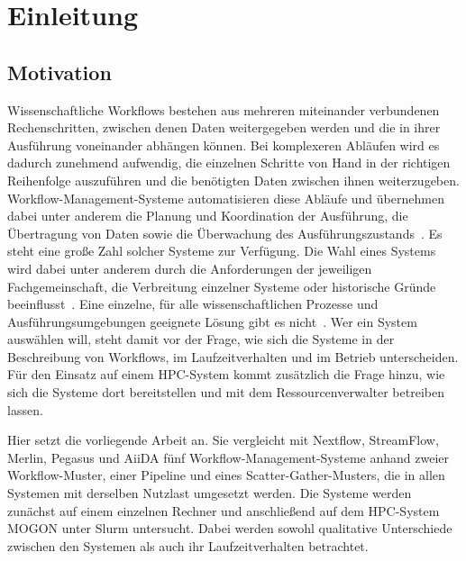 \chapter{Einleitung}
\label{sec:intro}

\section{Motivation}
\label{sec:intro:motivation}
Wissenschaftliche Workflows bestehen aus mehreren miteinander
verbundenen Rechenschritten, zwischen denen Daten weitergegeben
werden und die in ihrer Ausführung voneinander abhängen können.
Bei komplexeren Abläufen wird es dadurch zunehmend aufwendig, die
einzelnen Schritte von Hand in der richtigen Reihenfolge
auszuführen und die benötigten Daten zwischen ihnen weiterzugeben.
Workflow-Management-Systeme automatisieren diese Abläufe und
übernehmen dabei unter anderem die Planung und Koordination der
Ausführung, die Übertragung von Daten sowie die Überwachung des
Ausführungszustands~\cite[S.~28\,f.]{badia2017workflows}\cite[S.~2]{suter2026terminology}.
Es steht eine große Zahl solcher Systeme zur Verfügung. Die Wahl
eines Systems wird dabei unter anderem durch die Anforderungen der
jeweiligen Fachgemeinschaft, die Verbreitung einzelner Systeme
oder historische Gründe beeinflusst~\cite[S.~28]{badia2017workflows}. Eine einzelne, für alle wissenschaftlichen Prozesse und Ausführungsumgebungen geeignete Lösung gibt es nicht~\cite[S.~2]{suter2026terminology}. Wer ein System auswählen will, steht damit vor der Frage, wie sich die Systeme in der
Beschreibung von Workflows, im Laufzeitverhalten und im Betrieb
unterscheiden. Für den Einsatz auf einem HPC-System kommt
zusätzlich die Frage hinzu, wie sich die Systeme dort
bereitstellen und mit dem Ressourcenverwalter betreiben lassen.

Hier setzt die vorliegende Arbeit an. Sie vergleicht mit Nextflow,
StreamFlow, Merlin, Pegasus und AiiDA fünf
Workflow-Management-Systeme anhand zweier Workflow-Muster, einer
Pipeline und eines Scatter-Gather-Musters, die in allen Systemen
mit derselben Nutzlast umgesetzt werden. Die Systeme werden
zunächst auf einem einzelnen Rechner und anschließend auf dem
HPC-System MOGON unter Slurm untersucht. Dabei werden sowohl
qualitative Unterschiede zwischen den Systemen als auch ihr
Laufzeitverhalten betrachtet.


